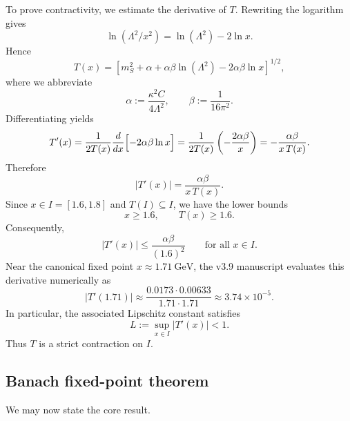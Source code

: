 To prove contractivity, we estimate the derivative of \(T\). Rewriting the logarithm gives
\begin{equation}
\ln(\Lambda^2/x^2)=\ln(\Lambda^2)-2\ln x.
\label{eq:log_expansion}
\end{equation}
Hence
\begin{equation}
T(x)
=
\left[
m_S^2+\alpha+\alpha\beta\ln(\Lambda^2)-2\alpha\beta\ln x
\right]^{1/2},
\label{eq:T_expanded}
\end{equation}
where we abbreviate
\begin{equation}
\alpha:=\frac{\kappa^2 C}{4\Lambda^2},
\qquad
\beta:=\frac{1}{16\pi^2}.
\label{eq:alpha_beta_def}
\end{equation}
Differentiating yields
\begin{equation}
T'(x)
=
\frac{1}{2T(x)}
\frac{d}{dx}\Bigl[-2\alpha\beta\ln x\Bigr]
=
\frac{1}{2T(x)}\left(-\frac{2\alpha\beta}{x}\right)
=
-\frac{\alpha\beta}{x\,T(x)}.
\label{eq:T_derivative}
\end{equation}
Therefore
\begin{equation}
|T'(x)|=\frac{\alpha\beta}{x\,T(x)}.
\label{eq:T_deriv_abs}
\end{equation}
Since \(x\in I=[1.6,1.8]\) and \(T(I)\subseteq I\), we have the lower bounds
\begin{equation}
x\geq 1.6,\qquad T(x)\geq 1.6.
\label{eq:lower_bounds}
\end{equation}
Consequently,
\begin{equation}
|T'(x)|
\leq
\frac{\alpha\beta}{(1.6)^2}
\qquad \text{for all } x\in I.
\label{eq:lipschitz_bound}
\end{equation}
Near the canonical fixed point \(x\approx 1.71\ \mathrm{GeV}\), the v3.9 manuscript evaluates this derivative numerically as
\begin{equation}
|T'(1.71)|\approx
\frac{0.0173\cdot 0.00633}{1.71\cdot 1.71}
\approx 3.74\times 10^{-5}.
\label{eq:numerical_deriv}
\end{equation}
In particular, the associated Lipschitz constant satisfies
\begin{equation}
L:=\sup_{x\in I}|T'(x)|<1.
\label{eq:lipschitz_strict}
\end{equation}
Thus \(T\) is a strict contraction on \(I\).

\subsection{Banach fixed-point theorem}

We may now state the core result.


